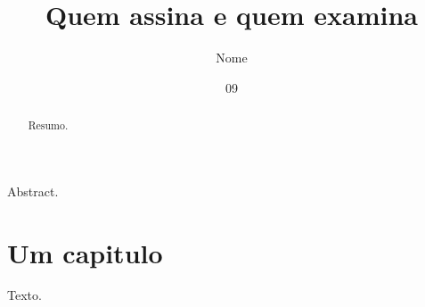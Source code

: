 \documentclass[dsc]{ufrj}
\title{Quem assina e quem examina}
\author{Nome}{Sobrenome}
\date{09}{2026}
\begin{document}
  \maketitle
  \frontmatter
  \begin{abstract}Resumo.\end{abstract}
  \begin{foreignabstract}Abstract.\end{foreignabstract}
  \tableofcontents
  \mainmatter
  \chapter{Um capitulo}
  Texto.
\end{document}
